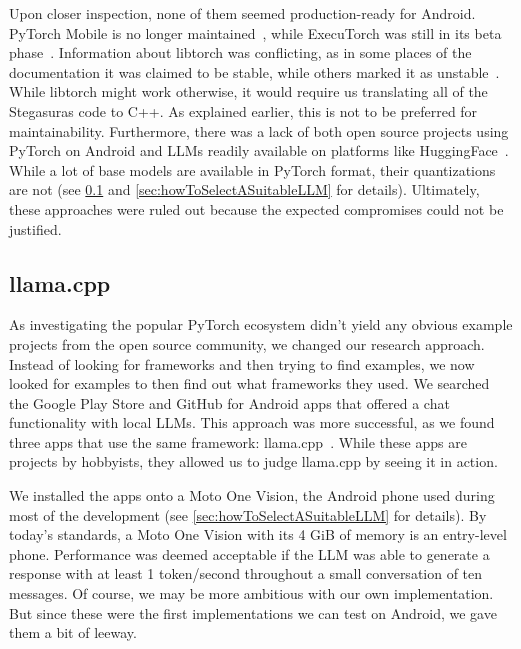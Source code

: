 Upon closer inspection, none of them seemed production-ready for Android. PyTorch Mobile is no longer maintained~\cite{pytorchPytorchAndroiddemoapp2025}, while ExecuTorch was still in its beta phase~\cite{pytorchPytorchExecutorch2025}. Information about libtorch was conflicting, as in some places of the documentation it was claimed to be stable, while others marked it as unstable~\cite{pytorchStartLocally,pytorchPyTorchAPIPyTorch}. While libtorch might work otherwise, it would require us translating all of the Stegasuras code to C++. As explained earlier, this is not to be preferred for maintainability. Furthermore, there was a lack of both open source projects using PyTorch on Android and \glspl{LLM} readily available on platforms like HuggingFace~\cite{huggingfaceModelsHuggingFace2025}. While a lot of base models are available in PyTorch format, their quantizations are not (see \cref{sec:llamaCpp} and \cref{sec:howToSelectASuitableLLM} for details). Ultimately, these approaches were ruled out because the expected compromises could not be justified.

\subsection{llama.cpp}
\label{sec:llamaCpp}
As investigating the popular PyTorch ecosystem didn't yield any obvious example projects from the open source community, we changed our research approach. Instead of looking for frameworks and then trying to find examples, we now looked for examples to then find out what frameworks they used. We searched the Google Play Store and GitHub for Android apps that offered a chat functionality with local \glspl{LLM}. This approach was more successful, as we found three apps that use the same framework: llama.cpp~\cite{panchalShubham0204SmolChatAndroid2025,vali-98Vali98ChatterUI2025,ghorbaniAghorbaniPocketpalai2025}. While these apps are projects by hobbyists, they allowed us to judge llama.cpp by seeing it in action.

We installed the apps onto a Moto One Vision, the Android phone used during most of the development (see \cref{sec:howToSelectASuitableLLM} for details). By today's standards, a Moto One Vision with its 4 GiB of memory is an entry-level phone. Performance was deemed acceptable if the \gls{LLM} was able to generate a response with at least 1 token/second throughout a small conversation of ten messages. Of course, we may be more ambitious with our own implementation. But since these were the first implementations we can test on Android, we gave them a bit of leeway.


